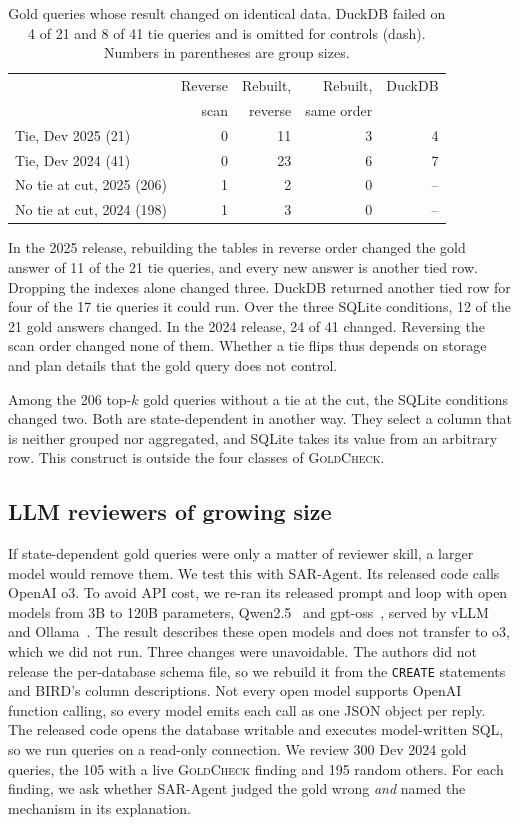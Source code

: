 \documentclass[conference]{IEEEtran}
\newcommand{\sys}{\textsc{GoldCheck}}
\begin{document}
\begin{table}[t]
\caption{Gold queries whose result changed on identical data. DuckDB failed on
4 of 21 and 8 of 41 tie queries and is omitted for controls (dash). Numbers in parentheses are group sizes.}
\label{tab:engines}
\centering
\footnotesize
\setlength{\tabcolsep}{3pt}
\begin{tabular}{@{}lrrrr@{}}
\toprule
 & Reverse & Rebuilt, & Rebuilt, & DuckDB \\
 & scan & reverse & same order & \\
\midrule
Tie, Dev 2025 (21) & 0 & 11 & 3 & 4 \\
Tie, Dev 2024 (41) & 0 & 23 & 6 & 7 \\
No tie at cut, 2025 (206) & 1 & 2 & 0 & -- \\
No tie at cut, 2024 (198) & 1 & 3 & 0 & -- \\
\bottomrule
\end{tabular}
\end{table}

In the 2025 release, rebuilding the tables in reverse order changed the gold
answer of 11 of the 21 tie queries, and every new answer is another tied row.
Dropping the indexes alone changed three. DuckDB returned another tied row for
four of the 17 tie queries it could run. Over the three SQLite conditions, 12 of
the 21 gold answers changed. In the 2024 release, 24 of 41 changed. Reversing the scan order changed none of them. Whether a tie flips thus depends on storage and plan details that the gold query does not control.

Among the 206 top-$k$ gold queries without a tie at the cut, the SQLite
conditions changed two. Both are state-dependent in another way. They select a
column that is neither grouped nor aggregated, and SQLite takes its value from
an arbitrary row. This construct is outside the four classes of \sys{}.

\subsection{LLM reviewers of growing size}
\label{sec:llm}
If state-dependent gold queries were only a matter of reviewer skill, a larger
model would remove them. We test this with SAR-Agent. Its released code calls
OpenAI o3. To avoid API cost, we re-ran its released prompt and loop with open
models from 3B to 120B parameters, Qwen2.5~\cite{qwen2024qwen25,hui2024qwen25coder} and gpt-oss~\cite{openai2025gptoss}, served by vLLM~\cite{kwon2023vllm} and Ollama~\cite{ollama}. The result describes these open models and does not transfer to o3, which we did not run. Three changes were
unavoidable. The authors did not release the per-database schema file, so we
rebuild it from the \texttt{CREATE} statements and BIRD's column descriptions.
Not every open model supports OpenAI function calling, so every model emits each
call as one JSON object per reply. The released code opens the database writable
and executes model-written SQL, so we run queries on a read-only connection. We
review 300 Dev 2024 gold queries, the 105 with a live \sys{} finding and 195
random others. For each finding, we ask whether SAR-Agent judged the gold wrong
\emph{and} named the mechanism in its explanation.
\end{document}
